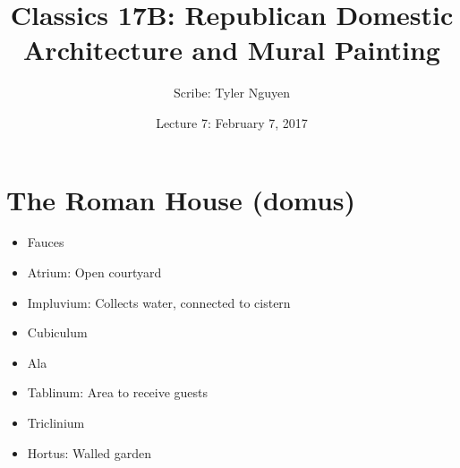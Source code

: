 \documentclass{article}
\begin{document}
\title{Classics 17B: Republican Domestic Architecture and Mural Painting}
\author{Scribe: Tyler Nguyen}
\date{Lecture 7: February 7, 2017}
\maketitle
\section{The Roman House (domus)}
\begin{itemize}
\item Fauces
\item Atrium: Open courtyard
\item Impluvium: Collects water, connected to cistern
\item Cubiculum
\item Ala
\item Tablinum: Area to receive guests
\item Triclinium
\item Hortus: Walled garden
\end{itemize}
\end{document}
